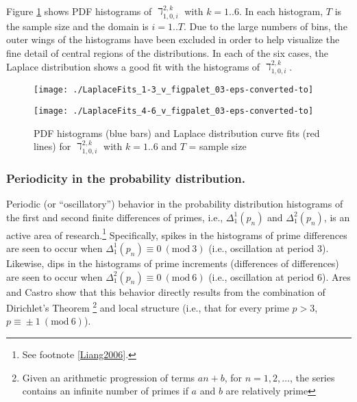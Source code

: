\documentclass[12pt,longtitle,times]{amsart}
\begin{document}
Figure \ref{fig:LaplaceFits} shows PDF histograms of $\daleth_{1,0,i}^{2,k}$ with $k=1..6$. In each histogram, $T$ is the sample size and the domain is $i=1..T$. Due to the large numbers of bins, the outer wings of the histograms have been excluded in order to help visualize the fine detail of central regions of the distributions. In each of the six cases, the Laplace distribution shows a good fit with the histograms of $\daleth_{1,0,i}^{2,k}$. 

\begin{figure}[hp]
\centering
\texttt{[image: ./LaplaceFits\_1-3\_v\_figpalet\_03-eps-converted-to]}

\texttt{[image: ./LaplaceFits\_4-6\_v\_figpalet\_03-eps-converted-to]}
\caption{PDF histograms (blue bars) and  Laplace distribution curve fits (red lines) for $\daleth_{1,0,i}^{2,k}$ with $k=1..6$ and $T$ = sample size}
\label{fig:LaplaceFits}
\end{figure}

\subsubsection[short]{\label{Periodicity in prob dists}Periodicity in the probability distribution.} Periodic (or ``oscillatory'') behavior in the probability distribution histograms of the first and second finite differences of primes, i.e., $\Delta_1^1(p_n)$ and $\Delta_1^2(p_n)$, is an active area of research.\cite{Ares-Hidden-2006,Dahmen-Similarity-In-The-Statistics-2001,Szpiro-TheGaps-2004,Szpiro-Peaks-and_Gaps-2007,Wolf1996,Wolf-Nearest_Neighbor-2014,Kumar-Information-Entropy-2003,Bershadskii-Hidden-2011}\footnote{See footnote \ref{Liang2006}.} Specifically, spikes in the histograms of prime differences are seen to occur when $\Delta_1^1(p_n)\equiv{}0{\ (\text{mod}\ {3})}$ (i.e., oscillation at period 3). Likewise, dips in the histograms of prime increments (differences of differences) are seen to occur when $\Delta_1^2(p_n)\equiv{}0{\ (\text{mod}\ {6})}$ (i.e., oscillation at period 6). Ares and Castro \cite{Ares-Hidden-2006} show that this behavior directly results from the combination of Dirichlet's Theorem \footnote{Given an arithmetic progression of terms $an+b$, for $n=1, 2,\dots{}$, the series contains an infinite number of primes if $a$ and $b$ are relatively prime} and local structure (i.e., that for every prime $p>3$, $p\equiv{}\pm{}1{\ (\text{mod}\ {6})}$).
\end{document}
